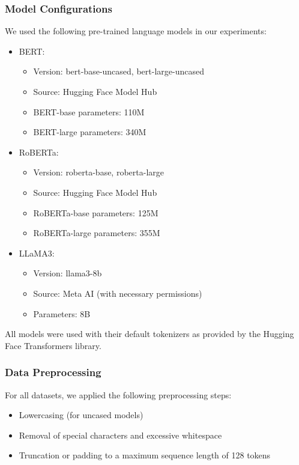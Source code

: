 \subsubsection{Model Configurations}
We used the following pre-trained language models in our experiments:
\begin{itemize}[leftmargin=*]
    \item BERT:
    \begin{itemize}
        \item Version: bert-base-uncased, bert-large-uncased
        \item Source: Hugging Face Model Hub
        \item BERT-base parameters: 110M
        \item BERT-large parameters: 340M
    \end{itemize}
    \item RoBERTa:
    \begin{itemize}
        \item Version: roberta-base, roberta-large
        \item Source: Hugging Face Model Hub
        \item RoBERTa-base parameters: 125M
        \item RoBERTa-large parameters: 355M
    \end{itemize}
    \item LLaMA3:
    \begin{itemize}
        \item Version: llama3-8b
        \item Source: Meta AI (with necessary permissions)
        \item Parameters: 8B
    \end{itemize}
\end{itemize}
All models were used with their default tokenizers as provided by the Hugging Face Transformers library.

\subsubsection{Data Preprocessing}
For all datasets, we applied the following preprocessing steps:
\begin{itemize}[leftmargin=*]
    \item Lowercasing (for uncased models)
    \item Removal of special characters and excessive whitespace
    \item Truncation or padding to a maximum sequence length of 128 tokens
\end{itemize}


